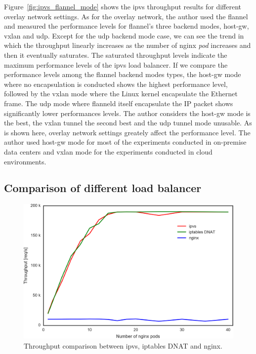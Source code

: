 Figure~\ref{fig:ipvs_flannel_mode} shows the ipvs throughput results for different overlay network settings.
As for the overlay network, the author used the flannel and measured the performance levels for flannel's three backend modes, host-gw, vxlan and udp.
Except for the udp backend mode case, we can see the trend in which the throughput linearly increases as the number of nginx {\em pod} increases and then it eventually saturates.
The saturated throughput levels indicate the maximum performance levels of the ipvs load balancer.
If we compare the performance levels among the flannel backend modes types, 
the host-gw mode where no encapsulation is conducted shows the highest performance level,
followed by the vxlan mode where the Linux kernel encapsulate the Ethernet frame.
The udp mode where flanneld itself encapsulate the IP packet shows significantly lower performances levels.
The author considers the host-gw mode is the best, the vxlan tunnel the second best and the udp tunnel mode unusable.
As is shown here, overlay network settings greately affect the performance level.
The author used host-gw mode for most of the experiments conducted in on-premise data centers and vxlan mode for the experiments conducted in cloud environments.  


\FloatBarrier

\subsection{Comparison of different load balancer}

\begin{figure}[htb]
  \centering
  \includegraphics[width=0.8\columnwidth]{Figs/ipvs-iptables-nginx}
  \caption{Throughput comparison between ipvs, iptables DNAT and nginx.}
  \label{fig:ipvs-iptables-nginx}
\end{figure}

